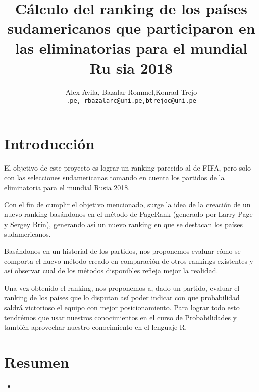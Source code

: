 \documentclass[twocolumn]{article}
\begin{document}
 

\title{
Cálculo del ranking de los países sudamericanos que participaron en las eliminatorias para el mundial Ru	sia 2018 
}
\date{}
\author{Alex Avila, Bazalar Rommel,Konrad Trejo\\
\small{\texttt{\@aavilas@uni.pe, rbazalarc@uni.pe,btrejoc@uni.pe}}}
\maketitle



\section{Introducción}

	El objetivo de este proyecto es lograr un ranking parecido al de FIFA, pero solo con las selecciones sudamericanas tomando en cuenta los partidos de la eliminatoria para el mundial Rusia 2018.

	Con el fin de cumplir el objetivo mencionado, surge la idea de la creación de un nuevo ranking basándonos en el método de PageRank (generado por Larry Page y Sergey Brin), generando así un nuevo ranking en que se destacan los países sudamericanos.

	Basándonos en un historial de los partidos, nos proponemos evaluar cómo se comporta el nuevo método creado en comparación de otros rankings existentes y así observar cual de los métodos disponibles refleja mejor la realidad.

	Una vez obtenido el ranking, nos proponemos a, dado un partido, evaluar el ranking de los países que lo disputan  así poder indicar con que probabilidad saldrá victorioso el equipo con mejor posicionamiento. Para lograr todo esto tendrémos que usar nuestros conocimientos en el curso de Probabilidades y también aprovechar nuestro conocimiento en el lenguaje R.


\section{Resumen}
\begin{itemize}
\item 
\end{itemize}

\end{document}
